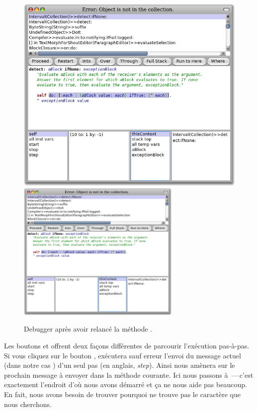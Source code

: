 \documentclass[a4paper,10pt,twoside]{book}
\begin{document}
\begin{figure}[btp]
	\begin{center}
	\ifluluelse
		{\includegraphics[width=\textwidth]{RestartDetectIfNone}}
		{\includegraphics[width=0.7\textwidth]{RestartDetectIfNone}}
	\end{center}
	\caption{Debugger après avoir relancé la méthode .}
\end{figure}

Les boutons  et  offrent deux façons différentes de 
parcourir l'exécution pas-à-pas.
Si vous cliquez sur le bouton  ,
\pharo exécutera sauf erreur l'envoi du message actuel (dans notre cas ) d'un
seul pas (en anglais, \emph{step}).
Ainsi  nous amènera sur le prochain message à envoyer dans la méthode courante.
Ici nous passons à \,---\,c'est exactement l'endroit d'où nous avons démarré
et ça ne nous aide pas beaucoup.
En fait, nous avons besoin de trouver pourquoi  ne trouve pas
le caractère que nous cherchons.
\end{document}
